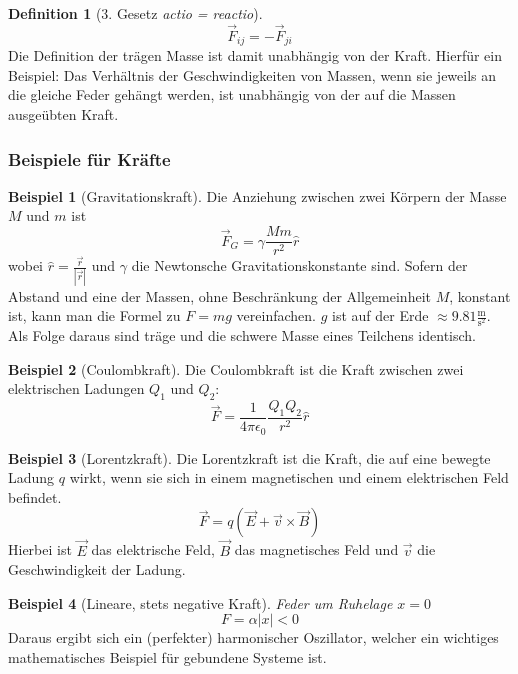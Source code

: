 \documentclass[oneside]{book}
\theoremstyle{definition}
\newtheorem*{definition*}{Definition}
\newtheorem*{beispiel*}{Beispiel}
\begin{document}
\begin{definition*}[3. Gesetz \textit{actio = reactio}]
\begin{equation*}
	\vec{F}_{ij} = -\vec{F}_{ji}
\end{equation*}
Die Definition der trägen Masse ist damit unabhängig von der Kraft. Hierfür ein Beispiel: Das Verhältnis der Geschwindigkeiten von Massen, wenn sie jeweils an die gleiche Feder gehängt werden, ist unabhängig von der auf die Massen ausgeübten Kraft.
\end{definition*}

\subsubsection{Beispiele für Kräfte}

\begin{beispiel*}[Gravitationskraft]
Die Anziehung zwischen zwei Körpern der Masse $M$ und $m$ ist 
$$\vec{F}_G = \gamma \frac{M m}{r^2} \hat{r}$$
 wobei $\hat{r} = \frac{\vec{r}}{|\vec{r}|}$ und $\gamma$ die Newtonsche Gravitationskonstante sind. Sofern der Abstand und eine der Massen, ohne Beschränkung der Allgemeinheit $M$, konstant ist, kann man die Formel zu $F = m g$ vereinfachen. $g$ ist auf der Erde $\approx 9.81 \frac{\text{m}}{\text{s}^2}$.
 Als Folge daraus sind träge und die schwere Masse eines Teilchens identisch.
\end{beispiel*}

\begin{beispiel*}[Coulombkraft]
Die Coulombkraft ist die Kraft zwischen zwei elektrischen Ladungen $Q_1$ und $Q_2$:
\begin{equation*}
	\vec{F} = \frac{1}{4 \pi \epsilon_0} \frac{Q_1 Q_2}{r^2} \hat{r}
\end{equation*}
\end{beispiel*}

\begin{beispiel*}[Lorentzkraft]
Die Lorentzkraft ist die Kraft, die auf eine bewegte Ladung $q$ wirkt, wenn sie sich in einem magnetischen und einem elektrischen Feld befindet. 
\begin{equation*}
	\vec{F} = q (\vec{E} + \vec{v} \times \vec{B})
\end{equation*}
Hierbei ist $\vec{E}$ das elektrische Feld, $\vec{B}$ das magnetisches Feld und $\vec{v}$ die Geschwindigkeit der Ladung.
\end{beispiel*}

\begin{beispiel*}[Lineare, stets negative Kraft]
\textit{Feder um Ruhelage $x = 0$}
$$F = \alpha |x| < 0$$
Daraus ergibt sich ein (perfekter) harmonischer Oszillator, welcher ein wichtiges mathematisches Beispiel für gebundene Systeme ist.
\end{beispiel*}
\end{document}
